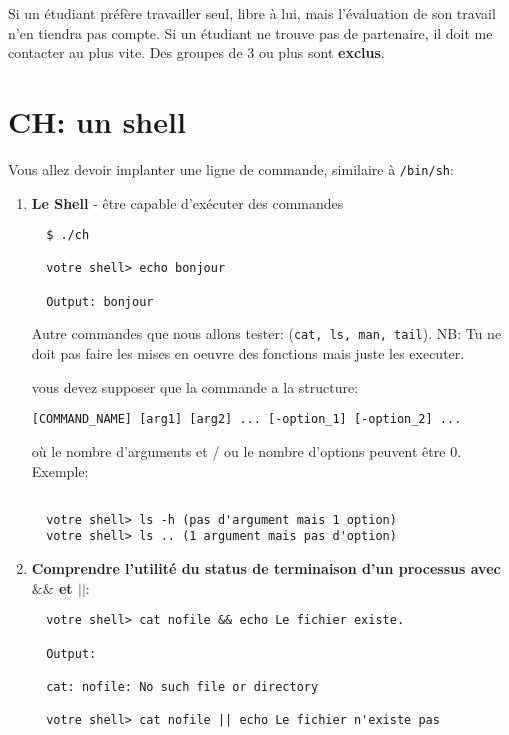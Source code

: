 \documentclass{article}
\begin{document}
Si un étudiant préfère travailler seul, libre à lui, mais l'évaluation de
son travail n'en tiendra pas compte.  Si un étudiant ne trouve pas de
partenaire, il doit me contacter au plus vite.  Des groupes de 3 ou plus
sont \textbf{exclus}.

\newpage
\section{CH: un shell}

Vous allez devoir implanter une ligne de commande, similaire
à \texttt{/bin/sh}:
\begin{enumerate}
\item \textbf{Le Shell} -  être capable d'exécuter des commandes

\begin{verbatim}  
  $ ./ch
  
  votre shell> echo bonjour

  Output: bonjour
\end{verbatim}

Autre commandes que nous allons tester: (\texttt{cat, ls, man, tail}). NB: Tu ne doit pas faire les mises en oeuvre des fonctions mais juste les executer.

vous devez supposer que la commande a la structure:

\begin{verbatim}
[COMMAND_NAME] [arg1] [arg2] ... [-option_1] [-option_2] ...
\end{verbatim}

où le nombre d'arguments et / ou le nombre d'options peuvent être 0. Exemple:

\begin{verbatim}

  votre shell> ls -h (pas d'argument mais 1 option)
  votre shell> ls .. (1 argument mais pas d'option)

\end{verbatim} 


\item \textbf{Comprendre l'utilité du status de terminaison d'un processus avec $\&\&$ et $||$}:

\begin{verbatim}
  votre shell> cat nofile && echo Le fichier existe.

  Output:
  
  cat: nofile: No such file or directory

  votre shell> cat nofile || echo Le fichier n'existe pas


\end{verbatim}
\end{enumerate}
\end{document}
